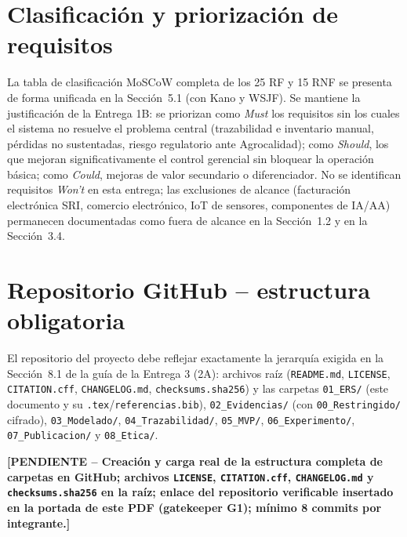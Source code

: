\documentclass[11pt,a4paper]{article}
\newcommand{\PENDIENTE}[1]{\textcolor{pendiente}{\textbf{[PENDIENTE -- #1]}}}
\begin{document}
\section{Clasificación y priorización de requisitos}
La tabla de clasificación MoSCoW completa de los 25 RF y 15 RNF se presenta de forma unificada en la Sección~5.1 (con Kano y WSJF). Se mantiene la justificación de la Entrega 1B: se priorizan como \textit{Must} los requisitos sin los cuales el sistema no resuelve el problema central (trazabilidad e inventario manual, pérdidas no sustentadas, riesgo regulatorio ante Agrocalidad); como \textit{Should}, los que mejoran significativamente el control gerencial sin bloquear la operación básica; como \textit{Could}, mejoras de valor secundario o diferenciador. No se identifican requisitos \textit{Won't} en esta entrega; las exclusiones de alcance (facturación electrónica SRI, comercio electrónico, IoT de sensores, componentes de IA/AA) permanecen documentadas como fuera de alcance en la Sección~1.2 y en la Sección~3.4.

\section{Repositorio GitHub -- estructura obligatoria}
El repositorio del proyecto debe reflejar exactamente la jerarquía exigida en la Sección~8.1 de la guía de la Entrega 3 (2A): archivos raíz (\texttt{README.md}, \texttt{LICENSE}, \texttt{CITATION.cff}, \texttt{CHANGELOG.md}, \texttt{checksums.sha256}) y las carpetas \texttt{01\_ERS/} (este documento y su \texttt{.tex}/\texttt{referencias.bib}), \texttt{02\_Evidencias/} (con \texttt{00\_Restringido/} cifrado), \texttt{03\_Modelado/}, \texttt{04\_Trazabilidad/}, \texttt{05\_MVP/}, \texttt{06\_Experimento/}, \texttt{07\_Publicacion/} y \texttt{08\_Etica/}.

\PENDIENTE{Creación y carga real de la estructura completa de carpetas en GitHub; archivos \texttt{LICENSE}, \texttt{CITATION.cff}, \texttt{CHANGELOG.md} y \texttt{checksums.sha256} en la raíz; enlace del repositorio verificable insertado en la portada de este PDF (gatekeeper G1); mínimo 8 commits por integrante.}

\end{document}
